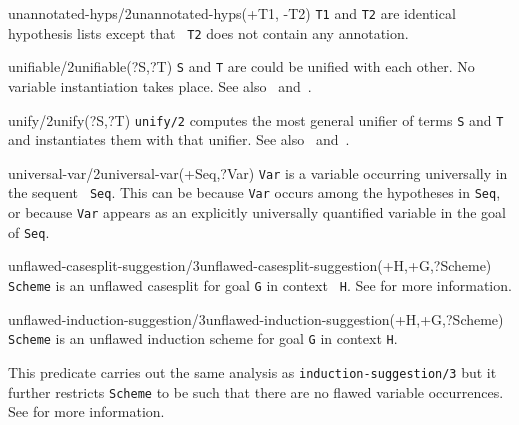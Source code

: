 \begin{predicate}{unannotated-hyps/2}{unannotated-hyps(+T1, -T2)}%
{\tt T1} and {\tt T2} are identical hypothesis lists except that {\tt
T2} does not contain any annotation.
\end{predicate}

\begin{predicate}{unifiable/2}{unifiable(?S,?T)}%
{\tt S} and {\tt T} are could be unified with each other.  No variable
instantiation takes place.  See also~ and~.
\end{predicate}

\begin{predicate}{unify/2}{unify(?S,?T)}%
{\tt unify/2} computes the most general unifier of terms {\tt S} and
{\tt T} and instantiates them with that unifier.  See
also~ and~.
\end{predicate}

\begin{predicate}{universal-var/2}{universal-var(+Seq,?Var)}%
{\tt Var} is a variable occurring universally in the sequent {\tt
Seq}.  This can be because {\tt Var} occurs among the hypotheses in
{\tt Seq}, or because {\tt Var} appears as an explicitly universally
quantified variable in the goal of {\tt Seq}.
\end{predicate}

\begin{predicate}{unflawed-casesplit-suggestion/3}{unflawed-casesplit-suggestion(+H,+G,?Scheme)}%
{\tt Scheme} is an unflawed casesplit for goal {\tt G} in context {\tt
H}.  See  for more information.
\end{predicate}

\begin{predicate}{unflawed-induction-suggestion/3}{unflawed-induction-suggestion(+H,+G,?Scheme)}%
{\tt Scheme} is an unflawed induction scheme for goal {\tt G} in
context {\tt H}.  

This predicate carries out the same analysis as
{\tt induction-suggestion/3} but it further restricts {\tt Scheme} to be
such that there are no flawed variable occurrences.  See
 for more information.
\end{predicate}

